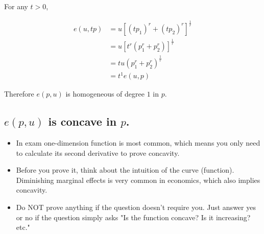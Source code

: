 \documentclass{article}
\begin{document}
For any $t>0$,

\begin{align*}
e(u,tp) &= u[(tp_1)^{r} + (tp_2)^{r}]^{\frac{1}{r}} \\
&= u[t^r(p_1^{r} + p_2^{r})]^{\frac{1}{r}} \\
&= tu(p_1^{r} + p_2^{r})^{\frac{1}{r}} \\
&= t^1e(u,p)
\end{align*}

Therefore $e(p, u)$ is homogeneous of degree $1$ in $p$.

\subsection{$e(p, u)$ is concave in $p$.}


\begin{mdframed}[backgroundcolor=yellow!20,linecolor=white]
\begin{itemize}
\item In exam one-dimension function is most common, which means you only need to 
calculate its second derivative to prove concavity.

\item Before you prove it, think about the intuition of the curve (function). Diminishing
marginal effects is very common in economics, which also implies concavity. 

\item Do NOT prove anything if the question doesn't require you. Just answer yes or no if the question
simply asks "Is the function concave? Is it increasing? etc."
\end{itemize}
\end{mdframed}
\end{document}

